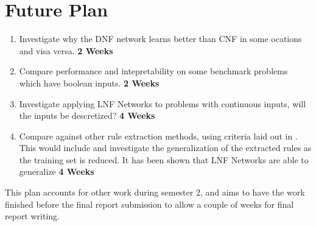 \chapter{Future Plan}\label{C:futureplan}

\begin{enumerate}
\item Investigate why the DNF network learns better than CNF in some ocations and visa versa. \textbf{2 Weeks}
\item Compare performance and intepretability on some benchmark problems which have boolean inputs. \textbf{2 Weeks}
\item Investigate applying LNF Networks to problems with continuous inputs, will the inputs be descretized? \textbf{4 Weeks}
\item Compare against other rule extraction methods, using criteria laid out in \cite{andrews1995survey}. This would include  and investigate the generalization of the extracted rules as the training set is reduced. It has been shown that LNF Networks are able to generalize \textbf{4 Weeks}
\end{enumerate}

This plan accounts for other work during semester 2, and aims to have the work finished before the final report submission to allow a couple of weeks for final report writing.
